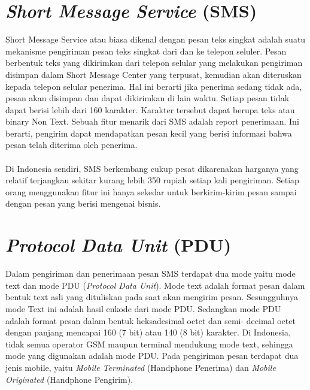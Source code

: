 \documentclass{jtetiproposalskripsi}
\begin{document}
\section{\textit{Short Message Service} (SMS) }
Short  Message  Service  atau   biasa  dikenal  dengan   pesan  teks   singkat adalah  suatu  mekanisme  pengiriman  pesan  teks  singkat  dari  dan  ke  telepon seluler.   Pesan   berbentuk   teks   yang   dikirimkan   dari   telepon   selular   yang melakukan  pengiriman  disimpan  dalam  Short  Message  Center  yang  terpusat, kemudian  akan  diteruskan  kepada  telepon  selular  penerima.  Hal  ini  berarti  jika penerima  sedang  tidak  ada,  pesan  akan  disimpan  dan  dapat  dikirimkan  di  lain waktu.  Setiap  pesan  tidak  dapat  berisi  lebih  dari  160  karakter.  Karakter  tersebut dapat  berupa  teks  atau  binary  Non  Text.  Sebuah  fitur  menarik  dari  SMS  adalah report  penerimaan.  Ini  berarti,  pengirim  dapat  mendapatkan  pesan  kecil  yang berisi informasi bahwa pesan telah diterima oleh penerima. 
\paragraph{}
Di Indonesia sendiri, SMS berkembang cukup pesat dikarenakan harganya yang  relatif  terjangkau  sekitar  kurang  lebih  350  rupiah  setiap  kali  pengiriman. Setiap  orang  menggunakan  fitur  ini  hanya  sekedar  untuk  berkirim-kirim  pesan sampai dengan pesan yang berisi mengenai bisnis. 


\section{\textit{Protocol Data Unit} (PDU)}
Dalam  pengiriman  dan  penerimaan  pesan  SMS  terdapat  dua  mode  yaitu  mode text  dan mode PDU (\textit{Protocol  Data  Unit}). Mode text  adalah  format  pesan dalam   bentuk   text   asli   yang   dituliskan   pada   saat   akan   mengirim   pesan. Sesungguhnya  mode  Text  ini  adalah  hasil  enkode  dari  mode  PDU.  Sedangkan mode  PDU  adalah  format  pesan  dalam  bentuk  heksadesimal  octet  dan  semi- decimal  octet  dengan panjang mencapai  160 (7  bit) atau 140 (8  bit) karakter. Di Indonesia,  tidak  semua  operator  GSM  maupun  terminal  mendukung  mode  text, sehingga   mode   yang   digunakan   adalah   mode   PDU.   Pada   pengiriman   pesan terdapat  dua  jenis  mobile,  yaitu  \textit{Mobile  Terminated}  (Handphone  Penerima)  dan \textit{Mobile Originated} (Handphone Pengirim). 
\end{document}
